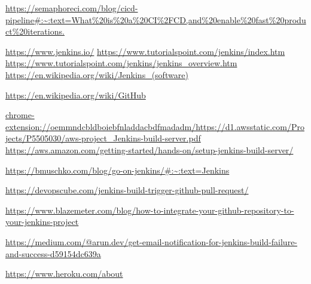 \documentclass[12pt,a4paper,twoside]{article}
\begin{document}
\begin{thebibliography}{100}

	 \url{https://semaphoreci.com/blog/cicd-pipeline#:~:text=What\%20is\%20a\%20CI\%2FCD,and\%20enable\%20fast\%20product\%20iterations.}	

	\bibitem{} \url{https://www.jenkins.io/}
	\bibitem{} \url{https://www.tutorialspoint.com/jenkins/index.htm}
	 \url{https://www.tutorialspoint.com/jenkins/jenkins_overview.htm}
	\bibitem{} \url{https://en.wikipedia.org/wiki/Jenkins_(software)}

	\bibitem{} \url{https://en.wikipedia.org/wiki/GitHub}

	\bibitem{} \url{chrome-extension://oemmndcbldboiebfnladdacbdfmadadm/https://d1.awsstatic.com/Projects/P5505030/aws-project_Jenkins-build-server.pdf}
	 \url{https://aws.amazon.com/getting-started/hands-on/setup-jenkins-build-server/}

	\bibitem{} \url{https://bmuschko.com/blog/go-on-jenkins/#:~:text=Jenkins}

	\bibitem{} \url{https://devopscube.com/jenkins-build-trigger-github-pull-request/}


	\bibitem{} \url{https://www.blazemeter.com/blog/how-to-integrate-your-github-repository-to-your-jenkins-project}

	\bibitem{} \url{https://medium.com/@arun.dev/get-email-notification-for-jenkins-build-failure-and-success-d59154dc639a}

	\bibitem{} \url{https://www.heroku.com/about}

\end{thebibliography}
\end{document}

